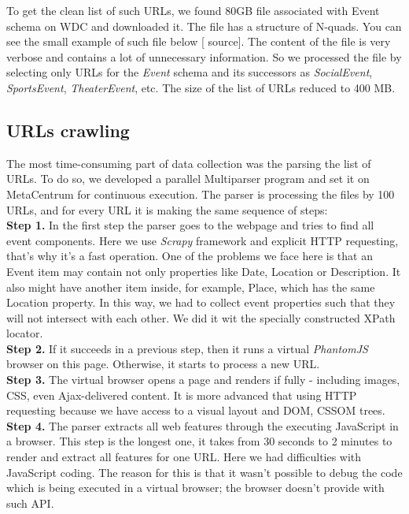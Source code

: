 To get the clean list of such URLs, we found 80GB file associated with Event schema on WDC and downloaded it. The file has a structure of N-quads. You can see the small example of such file below [ source]. The content of the file is very verbose and contains a lot of unnecessary information. So we processed the file by selecting only URLs for the \textit{Event} schema and its successors as \textit{SocialEvent}, \textit{SportsEvent}, \textit{TheaterEvent}, etc. The size of the list of URLs reduced to 400 MB. 

\subsection{URLs crawling}
\label{sec:urlparse}

The most time-consuming part of data collection was the parsing the list of URLs. To do so, we developed a parallel Multiparser program and set it on MetaCentrum for continuous execution. The parser is processing the files by 100 URLs, and for every URL it is making the same sequence of steps:\\

\noindent\textbf{Step 1.} In the first step the parser goes to the webpage and tries to find all event components. Here we use \textit{Scrapy} framework and explicit HTTP requesting, that's why it's a fast operation. One of the problems we face here is that an Event item may contain not only properties like Date, Location or Description. It also might have another item inside, for example, Place, which has the same Location property. In this way, we had to collect event properties such that they will not intersect with each other. We did it wit the specially constructed XPath locator. \\

\noindent\textbf{Step 2.} If it succeeds in a previous step, then it runs a virtual \textit{PhantomJS} browser on this page. Otherwise, it starts to process a new URL.\\

\noindent\textbf{Step 3.} The virtual browser opens a page and renders if fully - including images, CSS, even Ajax-delivered content. It is more advanced that using HTTP requesting because we have access to a visual layout and DOM, CSSOM trees.\\

\noindent\textbf{Step 4.} The parser extracts all web features through the executing JavaScript in a browser. This step is the longest one, it takes from 30 seconds to 2 minutes to render and extract all features for one URL. Here we had difficulties with JavaScript coding. The reason for this is that it wasn't possible to debug the code which is being executed in a virtual browser; the browser doesn't provide with such API.\\

